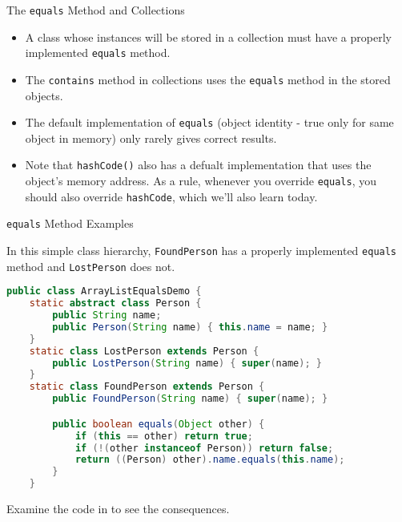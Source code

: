 \documentclass{beamer}
\begin{document}
\begin{frame}[fragile]{The {\tt equals} Method and Collections}



\begin{itemize}
\item A class whose instances will be stored in a collection must have a properly implemented {\tt equals} method.
\item The {\tt contains} method in collections uses the {\tt equals} method in the stored objects.
\item The default implementation of {\tt equals} (object identity - true only for same object in memory) only rarely gives correct results.
\item Note that {\tt hashCode()} also has a defualt implementation that uses the object's memory address.  As a rule, whenever you override {\tt equals}, you should also override {\tt hashCode}, which we'll also learn today.
\end{itemize}


\end{frame}

\begin{frame}[fragile]{{\tt equals} Method Examples}

\vspace{-.05in}
In this simple class hierarchy, {\tt FoundPerson} has a properly implemented {\tt equals} method and {\tt LostPerson} does not.
\vspace{-.05in}
\begin{lstlisting}[language=Java]
public class ArrayListEqualsDemo {
    static abstract class Person {
        public String name;
        public Person(String name) { this.name = name; }
    }
    static class LostPerson extends Person {
        public LostPerson(String name) { super(name); }
    }
    static class FoundPerson extends Person {
        public FoundPerson(String name) { super(name); }

        public boolean equals(Object other) {
            if (this == other) return true;
            if (!(other instanceof Person)) return false;
            return ((Person) other).name.equals(this.name);
        }
    }
\end{lstlisting}
\vspace{-.05in}
Examine the code in  to see the consequences.

\end{frame}
\end{document}
